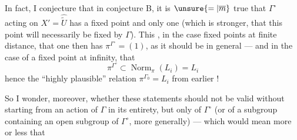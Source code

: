 In fact, I conjecture that in conjecture B, it is $\unsure{=|\overline m}$ true that $\Gamma^\circ$ acting on $X'=\widehat{\widetilde U}$ has a fixed point and only one (which is stronger, that this  point will necessarily be fixed by $\Gamma$). This , in the case  fixed points at finite distance, that one then has $\pi^{\Gamma^\circ}=(1)$, as it should be in general --- and in the case of a fixed point at infinity, that
\[
\pi^{\Gamma^\circ}\subset\operatorname{Norm}_{\pi}(L_i)=L_i
\]
hence the ``highly plausible'' relation $\pi^{\Gamma_0}=L_i$ from earlier !

So I wonder, moreover, whether these statements should not be valid without starting from an action of $\Gamma$  in its entirety, but only of $\Gamma^\circ$ (or of a subgroup containing an open subgroup of $\Gamma^\circ$, more generally) --- which would mean more or less that
